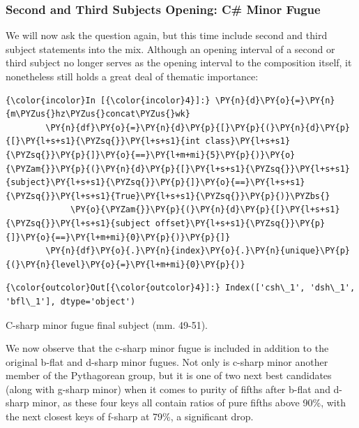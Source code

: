 \subsubsection{Second and Third Subjects Opening: C\# Minor
Fugue}\label{second-and-third-subjects-opening-c-minor-fugue}

We will now ask the question again, but this time include second and
third subject statements into the mix. Although an opening interval of a
second or third subject no longer serves as the opening interval to the
composition itself, it nonetheless still holds a great deal of thematic
importance:

    \begin{Verbatim}[commandchars=\\\{\}]
{\color{incolor}In [{\color{incolor}4}]:} \PY{n}{d}\PY{o}{=}\PY{n}{m\PYZus{}hz\PYZus{}concat\PYZus{}wk}
        \PY{n}{df}\PY{o}{=}\PY{n}{d}\PY{p}{[}\PY{p}{(}\PY{n}{d}\PY{p}{[}\PY{l+s+s1}{\PYZsq{}}\PY{l+s+s1}{int class}\PY{l+s+s1}{\PYZsq{}}\PY{p}{]}\PY{o}{==}\PY{l+m+mi}{5}\PY{p}{)}\PY{o}{\PYZam{}}\PY{p}{(}\PY{n}{d}\PY{p}{[}\PY{l+s+s1}{\PYZsq{}}\PY{l+s+s1}{subject}\PY{l+s+s1}{\PYZsq{}}\PY{p}{]}\PY{o}{==}\PY{l+s+s1}{\PYZsq{}}\PY{l+s+s1}{True}\PY{l+s+s1}{\PYZsq{}}\PY{p}{)}\PYZbs{}
             \PY{o}{\PYZam{}}\PY{p}{(}\PY{n}{d}\PY{p}{[}\PY{l+s+s1}{\PYZsq{}}\PY{l+s+s1}{subject offset}\PY{l+s+s1}{\PYZsq{}}\PY{p}{]}\PY{o}{==}\PY{l+m+mi}{0}\PY{p}{)}\PY{p}{]}
        \PY{n}{df}\PY{o}{.}\PY{n}{index}\PY{o}{.}\PY{n}{unique}\PY{p}{(}\PY{n}{level}\PY{o}{=}\PY{l+m+mi}{0}\PY{p}{)}
\end{Verbatim}
\begin{Verbatim}[commandchars=\\\{\}]
{\color{outcolor}Out[{\color{outcolor}4}]:} Index(['csh\_1', 'dsh\_1', 'bfl\_1'], dtype='object')
\end{Verbatim}


\begin{Example}[H]
\vspace{1.5em}
    \centering
    \caption{ C-sharp minor fugue final subject (mm. 49-51). }
\end{Example}    
    We now observe that the c-sharp minor fugue is included in addition to
the original b-flat and d-sharp minor fugues. Not only is c-sharp minor
another member of the Pythagorean group, but it is one of two next best
candidates (along with g-sharp minor) when it comes to purity of fifths
after b-flat and d-sharp minor, as these four keys all contain ratios of
pure fifths above 90\%, with the next closest keys of f-sharp at 79\%, a
significant drop.

